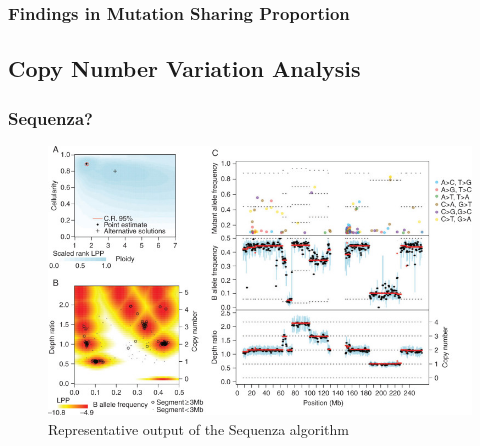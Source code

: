 \documentclass{beamer}
\begin{document}
    \begin{frame}
        \frametitle{Findings in Mutation Sharing Proportion}
    \end{frame}

    \subsection{Copy Number Variation Analysis}
     \begin{frame}
        \frametitle{Sequenza?}

        \begin{figure}
            \includegraphics[width=0.6 \linewidth]{figures/Workflow/sequenza.jpg}
            \caption{Representative output of the Sequenza algorithm \protect\cite{sequenza1}}
        \end{figure}
    \end{frame}
\end{document}
